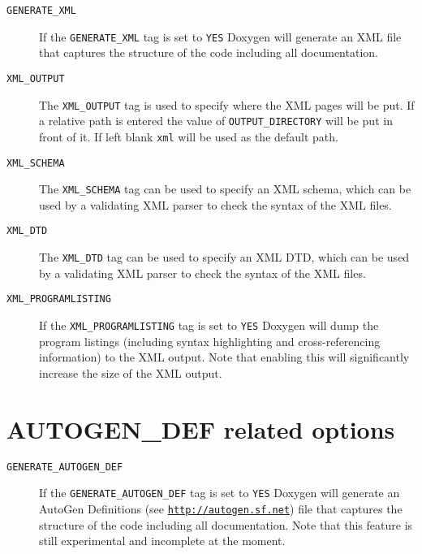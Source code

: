  \begin{description}
\item[{\tt GENERATE\_\-XML} ] If the {\tt GENERATE\_\-XML} tag is set to {\tt YES} Doxygen will generate an XML file that captures the structure of the code including all documentation.

\label{config_cfg_xml_output}
\hypertarget{config_cfg_xml_output}{}
 \item[{\tt XML\_\-OUTPUT} ] The {\tt XML\_\-OUTPUT} tag is used to specify where the XML pages will be put. If a relative path is entered the value of {\tt OUTPUT\_\-DIRECTORY} will be put in front of it. If left blank {\tt xml} will be used as the default path.

\label{config_cfg_xml_schema}
\hypertarget{config_cfg_xml_schema}{}
 \item[{\tt XML\_\-SCHEMA} ] The {\tt XML\_\-SCHEMA} tag can be used to specify an XML schema, which can be used by a validating XML parser to check the syntax of the XML files.

\label{config_cfg_xml_dtd}
\hypertarget{config_cfg_xml_dtd}{}
 \item[{\tt XML\_\-DTD} ] The {\tt XML\_\-DTD} tag can be used to specify an XML DTD, which can be used by a validating XML parser to check the syntax of the XML files.

\label{config_cfg_xml_programlisting}
\hypertarget{config_cfg_xml_programlisting}{}
 \item[{\tt XML\_\-PROGRAMLISTING} ] If the {\tt XML\_\-PROGRAMLISTING} tag is set to {\tt YES} Doxygen will dump the program listings (including syntax highlighting and cross-referencing information) to the XML output. Note that enabling this will significantly increase the size of the XML output.

\end{description}
\hypertarget{config_autogen_output}{}\section{AUTOGEN\_\-DEF related options}\label{config_autogen_output}
\label{config_cfg_generate_autogen_def}
\hypertarget{config_cfg_generate_autogen_def}{}
 \begin{description}
\item[{\tt GENERATE\_\-AUTOGEN\_\-DEF} ] If the {\tt GENERATE\_\-AUTOGEN\_\-DEF} tag is set to {\tt YES} Doxygen will generate an AutoGen Definitions (see \href{http://autogen.sf.net}{\tt http://autogen.sf.net}) file that captures the structure of the code including all documentation. Note that this feature is still experimental and incomplete at the moment.

\end{description}
